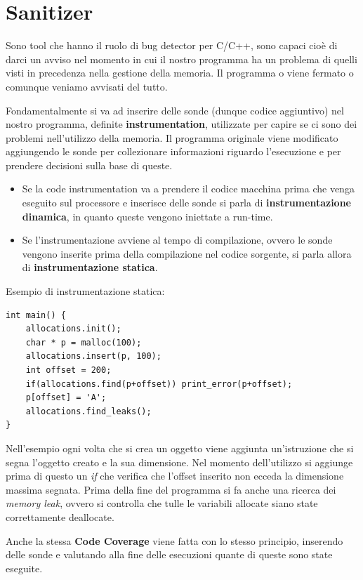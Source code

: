 \section{Sanitizer}

Sono tool che hanno il ruolo di bug detector per C/C++, sono capaci cioè di darci un
avviso nel momento in cui il nostro programma ha un problema di quelli visti in
precedenza nella gestione della memoria. Il programma o viene fermato o 
comunque veniamo avvisati del tutto.

Fondamentalmente si va ad inserire delle sonde (dunque codice aggiuntivo) nel nostro
programma, definite \textbf{instrumentation}, utilizzate per capire se ci sono dei problemi
nell'utilizzo della memoria. Il programma originale viene modificato 
aggiungendo le sonde per collezionare informazioni riguardo l'esecuzione e 
per prendere decisioni sulla base di queste.

\begin{itemize}
    \item Se la code instrumentation va a prendere il codice macchina prima che venga
    eseguito sul processore e inserisce delle sonde si parla di \textbf{instrumentazione
    dinamica}, in quanto queste vengono iniettate a run-time.
    \item Se l'instrumentazione avviene al tempo di compilazione, ovvero le sonde
    vengono inserite prima della compilazione nel codice sorgente, si parla allora
    di \textbf{instrumentazione statica}.
\end{itemize}
Esempio di instrumentazione statica:

\begin{lstlisting}
int main() {
    allocations.init();
    char * p = malloc(100);
    allocations.insert(p, 100);
    int offset = 200;
    if(allocations.find(p+offset)) print_error(p+offset);
    p[offset] = 'A';
    allocations.find_leaks();
}
\end{lstlisting}

Nell'esempio ogni volta che si crea un oggetto viene aggiunta un'istruzione che si
segna l'oggetto creato e la sua dimensione. Nel momento dell'utilizzo si aggiunge
prima di questo un \textit{if} che verifica che l'offset inserito non ecceda la dimensione
massima segnata. Prima della fine del programma si fa anche una 
ricerca dei \textit{memory leak}, ovvero si controlla che tulle le variabili allocate 
siano state correttamente deallocate.

Anche la stessa \textbf{Code Coverage} viene fatta con lo stesso principio, inserendo
delle sonde e valutando alla fine delle esecuzioni quante di queste sono state
eseguite.

